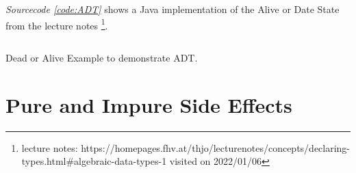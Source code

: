 \documentclass[a4paper,12pt,twoside]{scrreprt}
\begin{document}
\emph{Sourcecode \ref{code:ADT}} shows a Java implementation of the Alive or Date State from the lecture notes \footnote{ lecture notes: https://homepages.fhv.at/thjo/lecturenotes/concepts/declaring-types.html\#algebraic-data-types-1 visited on 2022/01/06}.
\begin{listing}[ht]
    \inputminted[fontsize=\footnotesize,linenos]{java}{./code/ADT.java}
    \caption[Example for a \ac{ADT}]{Dead or Alive Example to demonstrate \ac{ADT}.}
    \label{code:ADT}
\end{listing}

\section{Pure and Impure Side Effects}
\clearpage
{}
{}
\printbibliography
\end{document}
